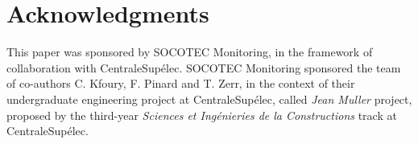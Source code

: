 \documentclass[runningheads]{llncs}
\begin{document}



\section*{Acknowledgments}
\label{sec:acknowledgments}
This paper was sponsored by SOCOTEC Monitoring, in the framework of collaboration with CentraleSupélec. SOCOTEC Monitoring sponsored the team of co-authors C. Kfoury, F. Pinard and T. Zerr, in the context of their undergraduate engineering project at CentraleSupélec, called \textit{Jean Muller} project, proposed by the third-year \textit{Sciences et Ingénieries de la Constructions} track at CentraleSupélec.
%
%
%


\end{document}
